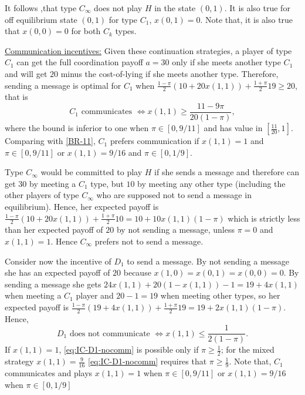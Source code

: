 \documentclass[12pt]{article}
\theoremstyle{definition}
\theoremstyle{remark}
\begin{document}
It follows ,that type $C_\infty$ does not play $H$ in the state $(0,1)$. It is also true for off equilibrium state $(0,1)$ for type $C_1$, $x(0,1)=0$. Note that, it is also true that $x(0,0)=0$ for both $C_k$ types.

\underline{Communication incentives:} Given these continuation strategies, a player of type $C_1$ can get the full coordination payoff $a=30$ only if she meets another type $C_1$ and will get $20$ minus the cost-of-lying if she meets another type. Therefore, sending a message is optimal for $C_1$ when $\frac{1-\pi}{2}(10 + 20x(1,1))+\frac{1+\pi}{2}19\geq 20$, that is  
\begin{equation}\label{eq:IC-C1-comm}
C_1\text{ communicates }\Leftrightarrow x(1,1)\geq \frac{1   1-9\pi}{20(1-\pi)},
\end{equation}
%
where the bound is inferior to one when $\pi\in[0,9/11]$ and has value in $\left[\frac{11}{20},1\right]$. Comparing with \eqref{BR-11}, $C_1$ prefers communication if $x(1,1) = 1$ and $\pi\in[0,9/11]$ or $x(1,1) = 9/16$ and $\pi\in[0,1/9]$.

Type $C_\infty$ would be committed to play $H$ if she sends a message and therefore can get $30$ by meeting a $C_1$ type, but $10$ by meeting any other type (including the other players of type $C_\infty$ who are supposed not to send a message in equilibrium). Hence, her expected payoff is $\frac{1-\pi}{2}(10+20x(1,1))+\frac{1+\pi}{2}10=10+10x(1,1) (1-\pi)$ which is strictly less than her expected payoff of $20$ by not sending a message, unless $\pi = 0$ and $x(1,1) = 1$. Hence $C_\infty$ prefers not to send a message.

Consider now the incentive of $D_1$ to send a message. By not sending a message she has an expected payoff of $20$ because $x(1,0)=x(0,1)=x(0,0)=0$. By sending a message she gets $24 x(1,1) + 20(1-x(1,1)) - 1 = 19 + 4x(1,1)$ when meeting a $C_1$ player and $20-1=19$ when meeting other types, so her expected payoff is $\frac{1-\pi}{2}(19 + 4x(1,1))+\frac{1+\pi}{2}19=19+2x(1,1)(1-\pi)$. Hence,
\begin{equation}\label{eq:IC-D1-nocomm}
    D_1 \text{ does not communicate } \Leftrightarrow x(1,1)\leq \frac{1}{2(1-\pi)}.
\end{equation}
%
If $x(1,1)=1$, \eqref{eq:IC-D1-nocomm} is possible only if $\pi\geq \frac{1}{2}$; for the mixed strategy $x(1,1)=\frac{9}{16}$   \eqref{eq:IC-D1-nocomm} requires that $\pi\geq \frac{1}{9}$. Note that, $C_1$ communicates and plays $x(1,1)=1$ when $\pi\in[0,9/11]$ or $x(1,1)=9/16$ when $\pi\in[0,1/9]$
\end{document}
